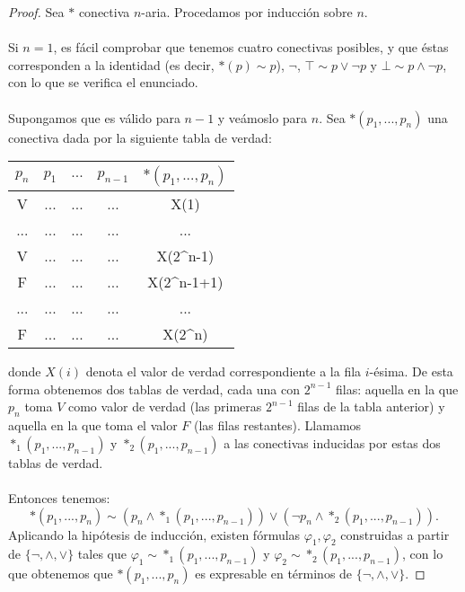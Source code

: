 \begin{proof}\label{def:compfunc}
Sea $*$ conectiva $n$-aria. Procedamos por inducción sobre $n$. \\ \\
Si $n = 1$, es fácil comprobar que tenemos cuatro conectivas posibles, y que éstas corresponden a la identidad (es decir, $*(p) \sim p$), $\neg$, $\top \sim p \lor \neg p$ y $\bot \sim p \land \neg p$, con lo que se verifica el enunciado.  \\ \\
Supongamos que es válido para $n-1$ y veámoslo para $n$. Sea $*(p_1, ..., p_n)$ una conectiva dada por la siguiente tabla de verdad:
\begin{table}[H]
\begin{center}
\begin{tabular}{|c|c c c|c|}
\hline
$p_n$ & $p_1$ & $...$ & $p_{n-1}$ & $*(p_1, ..., p_n)$\\
\hline \hline
V & ... & ... & ... & X(1)\\ \hline
... & ... & ... & ... & ...\\ \hline
V & ... & ... & ... & X(2^{n-1})\\ \hline
F & ... & ... & ... & X(2^{n-1}+1)\\ \hline
... & ... & ... & ... & ...\\ \hline
F & ... & ... & ... & X(2^{n})\\ \hline
\end{tabular}
\end{center}
\end{table}
\noindent donde $X(i)$ denota el valor de verdad correspondiente a la fila $i$-ésima. De esta forma obtenemos dos tablas de verdad, cada una con $2^{n-1}$ filas: aquella en la que $p_n$ toma $V$ como valor de verdad (las primeras $2^{n-1}$ filas de la tabla anterior) y aquella en la que toma el valor $F$ (las filas restantes). Llamamos $*_{1}(p_1, ..., p_{n-1})$ y $*_{2}(p_1, ..., p_{n-1})$ a las conectivas inducidas por estas dos tablas de verdad. \\ \\
Entonces tenemos: $$*(p_1, ..., p_n) \sim (p_n \land *_{1}(p_1, ..., p_{n-1})) \lor (\neg p_n \land *_{2}(p_1, ..., p_{n-1})).$$
Aplicando la hipótesis de inducción, existen fórmulas $\varphi_1, \varphi_2$ construidas a partir de $\{\neg, \land, \lor\}$ tales que $\varphi_1 \sim *_{1}(p_1, ..., p_{n-1})$ y $\varphi_2 \sim *_{2}(p_1, ..., p_{n-1})$, con lo que obtenemos que $*(p_1, ..., p_n)$ es expresable en términos de $\{\neg, \land, \lor\}$.
\end{proof}



